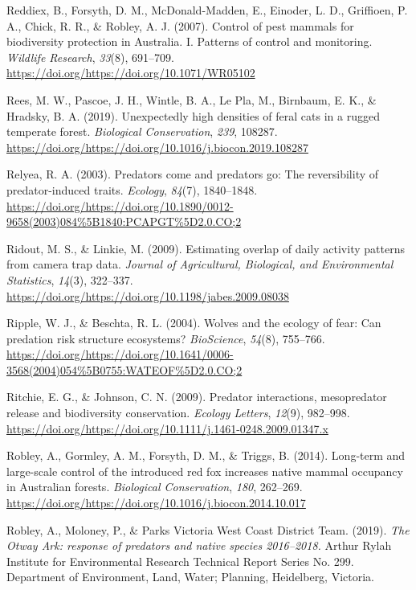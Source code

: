\documentclass[]{elsarticle} %
\begin{document}
\leavevmode\hypertarget{ref-reddiex2007control}{}%
Reddiex, B., Forsyth, D. M., McDonald-Madden, E., Einoder, L. D., Griffioen, P. A., Chick, R. R., \& Robley, A. J. (2007). Control of pest mammals for biodiversity protection in Australia. I. Patterns of control and monitoring. \emph{Wildlife Research}, \emph{33}(8), 691--709. \url{https://doi.org/https://doi.org/10.1071/WR05102}

\leavevmode\hypertarget{ref-rees2019unexpectedly}{}%
Rees, M. W., Pascoe, J. H., Wintle, B. A., Le Pla, M., Birnbaum, E. K., \& Hradsky, B. A. (2019). Unexpectedly high densities of feral cats in a rugged temperate forest. \emph{Biological Conservation}, \emph{239}, 108287. \url{https://doi.org/https://doi.org/10.1016/j.biocon.2019.108287}

\leavevmode\hypertarget{ref-relyea2003predators}{}%
Relyea, R. A. (2003). Predators come and predators go: The reversibility of predator-induced traits. \emph{Ecology}, \emph{84}(7), 1840--1848. \url{https://doi.org/https://doi.org/10.1890/0012-9658(2003)084\%5B1840:PCAPGT\%5D2.0.CO;2}

\leavevmode\hypertarget{ref-ridout2009estimating}{}%
Ridout, M. S., \& Linkie, M. (2009). Estimating overlap of daily activity patterns from camera trap data. \emph{Journal of Agricultural, Biological, and Environmental Statistics}, \emph{14}(3), 322--337. \url{https://doi.org/https://doi.org/10.1198/jabes.2009.08038}

\leavevmode\hypertarget{ref-ripple2004wolves}{}%
Ripple, W. J., \& Beschta, R. L. (2004). Wolves and the ecology of fear: Can predation risk structure ecosystems? \emph{BioScience}, \emph{54}(8), 755--766. \url{https://doi.org/https://doi.org/10.1641/0006-3568(2004)054\%5B0755:WATEOF\%5D2.0.CO;2}

\leavevmode\hypertarget{ref-ritchie2009predator}{}%
Ritchie, E. G., \& Johnson, C. N. (2009). Predator interactions, mesopredator release and biodiversity conservation. \emph{Ecology Letters}, \emph{12}(9), 982--998. \url{https://doi.org/https://doi.org/10.1111/j.1461-0248.2009.01347.x}

\leavevmode\hypertarget{ref-robley2014long}{}%
Robley, A., Gormley, A. M., Forsyth, D. M., \& Triggs, B. (2014). Long-term and large-scale control of the introduced red fox increases native mammal occupancy in Australian forests. \emph{Biological Conservation}, \emph{180}, 262--269. \url{https://doi.org/https://doi.org/10.1016/j.biocon.2014.10.017}

\leavevmode\hypertarget{ref-robley2019otway}{}%
Robley, A., Moloney, P., \& Parks Victoria West Coast District Team. (2019). \emph{The Otway Ark: response of predators and native species 2016--2018.} Arthur Rylah Institute for Environmental Research Technical Report Series No. 299. Department of Environment, Land, Water; Planning, Heidelberg, Victoria.
\end{document}
